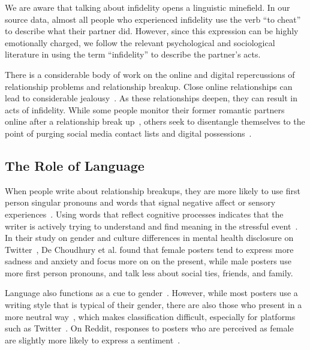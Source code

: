 We are aware that talking about infidelity opens a linguistic minefield. In our source data, almost all people who experienced infidelity   use the verb ``to cheat'' to describe what their partner did. However, since this expression can be highly emotionally charged, we follow the relevant psychological and sociological literature in using the term ``infidelity'' to describe the partner's acts. 

There is a considerable body of work on the online and digital repercussions of relationship problems and relationship breakup. Close online relationships can lead to considerable jealousy~\cite{demirtas-madran_relationship_2018,cohen_private_2014}. As these relationships deepen, they can result in acts of infidelity\cite{cravens_facebook_2013,mcdaniel_you_2017,Jain2018}. While some people monitor their former romantic partners online after a relationship break up~\cite{fox_romantic_2015,lukacs_romantic_2015}, others seek to disentangle themselves to the point of purging social media contact lists and digital possessions~\cite{herron_digital_2016,garimella2014love}. 

\subsection{The Role of Language}

When people write about relationship breakups, they are more likely to use first person singular pronouns and words that signal negative affect or sensory experiences~\cite{boals_word_2005}. Using words that reflect cognitive processes indicates that the writer is actively trying to understand and find meaning in the stressful event~\cite{boals_coping_2011}. In their study on gender and culture differences in mental health disclosure on Twitter~\cite{DeChoudhury2017gender}, De Choudhury et al. found that female posters tend to express more sadness and anxiety and focus more on on the present, while male posters use more first person pronouns, and talk less about social ties, friends, and family. 

Language also functions as a cue to gender~\cite{bamman_gender_2014,cesare_how_2017}. However, while most posters use a writing style that is typical of their gender, there are also those who present in a more neutral way~\cite{bamman_gender_2014}, which makes classification difficult, especially for platforms such as Twitter~\cite{nguyen_why_2014}. On Reddit, responses to posters who are perceived as female are slightly more likely to express a sentiment~\cite{voigt_rtgender:_2018}. 

